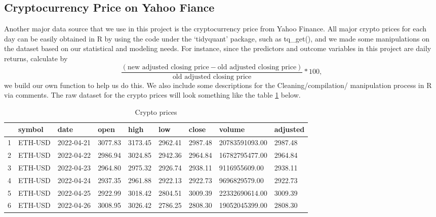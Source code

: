 \documentclass{article}
\begin{document}
\subsection{Cryptocurrency Price on Yahoo Fiance}
Another major data source that we use in this project is the cryptocurrency price from Yahoo Finance. All major crypto prices for each day can be easily obtained in R by using the code under the ‘tidyquant’ package, such as tq\_get(), and we made some manipulations on the dataset based on our statistical and modeling needs. For instance, since the predictors and outcome variables in this project are daily returns, calculate by $$\frac{(\text{new adjusted closing price} - \text{old adjusted closing price})}{\text{old adjusted closing price} }*100,$$ we build our own function to help us do this. We also include some descriptions for the Cleaning/compilation/ manipulation process in R via comments. The raw dataset for the crypto prices will look something like the table \ref{Crypto prices} below.

\begin{table}[ht]
\centering
\begin{tabular}{rllllllll}
  \hline
 & symbol & date & open & high & low & close & volume & adjusted \\ 
  \hline
1 & ETH-USD & 2022-04-21 & 3077.83 & 3173.45 & 2962.41 & 2987.48 & 20783591093.00 & 2987.48 \\ 
  2 & ETH-USD & 2022-04-22 & 2986.94 & 3024.85 & 2942.36 & 2964.84 & 16782795477.00 & 2964.84 \\ 
  3 & ETH-USD & 2022-04-23 & 2964.80 & 2975.32 & 2926.74 & 2938.11 & 9116955609.00 & 2938.11 \\ 
  4 & ETH-USD & 2022-04-24 & 2937.35 & 2961.88 & 2922.13 & 2922.73 & 9696829579.00 & 2922.73 \\ 
  5 & ETH-USD & 2022-04-25 & 2922.99 & 3018.42 & 2804.51 & 3009.39 & 22332690614.00 & 3009.39 \\ 
  6 & ETH-USD & 2022-04-26 & 3008.95 & 3026.42 & 2786.25 & 2808.30 & 19052045399.00 & 2808.30 \\ 
   \hline
\end{tabular}
\caption{Crypto prices} 
\label{Crypto prices}
\end{table}
\end{document}
